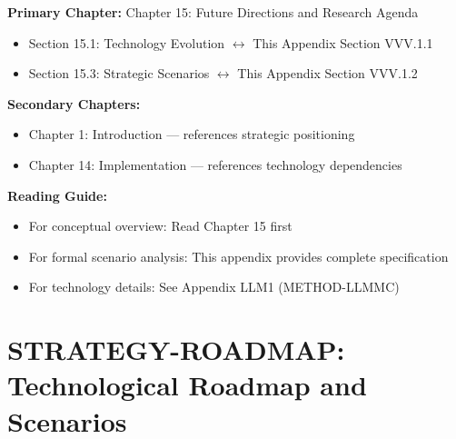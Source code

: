 \begin{tcolorbox}[colback=purple!5!white, colframe=purple!75!black,
    title=Chapter Linkage]

\textbf{Primary Chapter:} Chapter 15: Future Directions and Research Agenda
\begin{itemize}[nosep]
\item Section 15.1: Technology Evolution $\leftrightarrow$ This Appendix Section VVV.1.1
\item Section 15.3: Strategic Scenarios $\leftrightarrow$ This Appendix Section VVV.1.2
\end{itemize}

\textbf{Secondary Chapters:}
\begin{itemize}[nosep]
\item Chapter 1: Introduction --- references strategic positioning
\item Chapter 14: Implementation --- references technology dependencies
\end{itemize}

\textbf{Reading Guide:}
\begin{itemize}[nosep]
\item For conceptual overview: Read Chapter 15 first
\item For formal scenario analysis: This appendix provides complete specification
\item For technology details: See Appendix LLM1 (METHOD-LLMMC)
\end{itemize}

\end{tcolorbox}

\chapter{STRATEGY-ROADMAP: Technological Roadmap and Scenarios}
\label{app:vvv1-roadmap}

\begin{abstract}
This appendix analyzes technological evolution scenarios for EBF deployment
from 2024 to 2030+. We identify three axes of uncertainty (AI capability,
behavioral AI market maturity, platform landscape) and derive four archetypal
scenarios: Golden Window, Red Ocean, Slow Burn, and Platform Play. Each
scenario implies different strategic priorities for framework deployment,
partnership formation, and product development. The analysis connects to the
EBF context framework ($\Psi$) by treating technological and market conditions
as external context that shapes optimal strategy.
\end{abstract}

